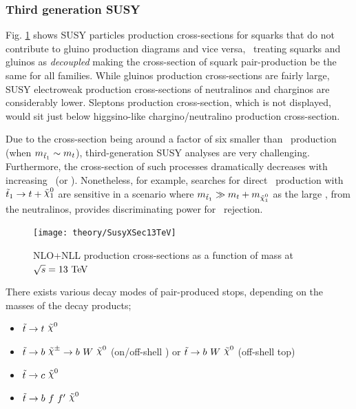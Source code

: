 			\subsubsection*{Third generation SUSY}

				Fig. \ref{fig:susy_13TeV_xsec} shows SUSY particles production cross-sections for squarks that do not contribute to gluino production diagrams and vice versa, \ie\ treating squarks and gluinos as \textit{decoupled} making the cross-section of squark pair-production be the same for all families. While gluinos production cross-sections are fairly large, SUSY electroweak production cross-sections of neutralinos and charginos are considerably lower. Sleptons production cross-section, which is not displayed, would sit just below higgsino-like chargino/neutralino production cross-section. 

				Due to the cross-section being around a factor of six smaller than \ttbar\ production (when $m_{\tilde{t}_1} \sim m_t$), third-generation SUSY analyses are very challenging. Furthermore, the cross-section of such processes dramatically decreases with increasing \mstop\ (or \msbottom). Nonetheless, for example, searches for direct \stopone\ production with $\stopone \ra t + \ninoone$ are sensitive in a scenario where $m_{\stopone} \gg m_t + m_{\ninoone}$ as the large \met, from the neutralinos, provides discriminating power for \ttbar\ rejection.

				\begin{figure}[!htb]
					\centering
					\texttt{[image: theory/SusyXSec13TeV]}
					\caption{\label{fig:susy_13TeV_xsec} NLO+NLL production cross-sections as a function of mass at $\sqrt{s} = 13 \TeV$ \cite{Borschensky:2014cia}}
				\end{figure}

				There exists various decay modes of pair-produced stops, depending on the masses of the decay products; 

				\begin{itemize}
					\item $\stop \ra t\ \nino$
					\item $\stop \ra b\ \chinopm \ra b\  W\  \nino$ (on/off-shell \Wboson) or $\stop \ra b\  W\  \nino$ (off-shell top)
					\item $\stop \ra c\ \nino$
					\item $\stop \ra b\ f\ f'\ \nino$
				\end{itemize} 

